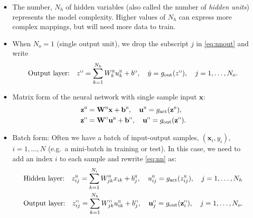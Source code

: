 \documentclass[11pt]{article}
\def\beq{\begin{equation}}
\def\eeq{\end{equation}}
\newcommand{\bbf}{\mathbf{b}}
\newcommand{\ubf}{\mathbf{u}}
\newcommand{\xbf}{\mathbf{x}}
\newcommand{\zbf}{\mathbf{z}}
\newcommand{\Wbf}{\mathbf{W}}
\def\hid{\textsc{\tiny H}}
\def\out{\textsc{\tiny O}}
\begin{document}
\begin{itemize}
\item The number, $N_h$ of hidden variables (also called the number of \emph{hidden units}) 
represents the model complexity.  Higher values of $N_h$ can express more complex mappings,
but will need more data to train.


\item When $N_o=1$ (single output unit), we drop the subscript $j$ in
\eqref{eq:nnout} and write
\beq
    \mbox{Output layer:} \quad
    z^\out = \sum_{k=1}^{N_h} W^\hid_{k}u^\hid_k + b^\out, \quad
    \hat{y} = g_{\rm out}(z^\out), \quad j=1,\ldots,N_o.
    \label{eq:nnout_scalar}
\eeq

\item  Matrix form of the neural network with single sample input $\xbf$:
\begin{align*}
    \zbf^\hid &= \Wbf^\hid\xbf + \bbf^\hid, \quad
    \ubf^\hid = g_{\rm act}(\zbf^\hid), \\
    \zbf^\out &= \Wbf^\out\ubf^\hid + \bbf^\out, \quad
    \ubf^\out = g_{\rm out}(\zbf^\out).
\end{align*}

\item Batch form:  Often we have a batch of input-output samples,
$(\xbf_i,y_i)$, $i=1,\ldots,N$ (e.g.\ a mini-batch in training or test).
In this case, we need to add an index $i$
to each sample and rewrite \eqref{eq:nn} as:
\begin{subequations} \label{eq:nnmulti}
\begin{align}
    &\mbox{Hidden layer:} \quad
    z_{ij}^\hid = \sum_{k=1}^{N_i} W^\hid_{jk}x_{ik} + b^\hid_j, \quad
    u_{ij}^\hid = g_{\rm act}(z_{ij}^\hid), \quad j=1,\ldots,N_h
    \label{eq:nnhidden_multi} \\
    &\mbox{Output layer:} \quad
    z_{ij}^\out = \sum_{k=1}^{N_h} W^\out_{jk}u^\hid_{ik} + b^\out_j,
    \quad
    \ubf_j^\out = g_{\rm out}(\zbf_i^\out),
    \quad j=1,\ldots,N_o.
    \label{eq:nnout_multi}
\end{align}
\end{subequations}


\end{itemize}
\end{document}
